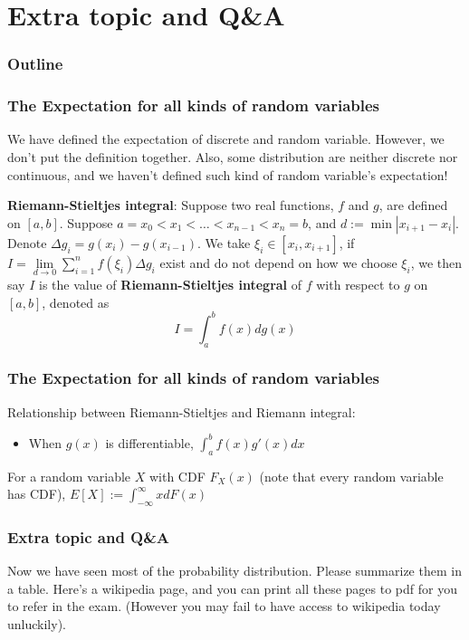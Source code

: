 \documentclass{beamer}
\begin{document}
\section{Extra topic and Q\&A}
\begin{frame}
    \frametitle{Outline}
    \tableofcontents[currentsection]
\end{frame}

\begin{frame}
    \frametitle{The Expectation for all kinds of random variables}
    We have defined the expectation of discrete and random variable. However, we don't put the definition together. Also, some distribution are neither discrete nor continuous, and we haven't defined such kind of random variable's expectation!\par
    \textbf{Riemann-Stieltjes integral}: Suppose two real functions, $f$ and $g$, are defined on $[a,b]$. Suppose $a=x_0<x_1<\dots <x_{n-1}<x_n=b$, and $d:=\min|x_{i+1}-x_{i}|$. Denote $\Delta g_i=g(x_i)-g(x_{i-1})$. We take $\xi_{i}\in [x_i,x_{i+1}]$, if $I=\lim\limits_{d\to 0}\sum\limits_{i=1}^{n}f(\xi_{i})\Delta g_i$ exist and do not depend on how we choose $\xi_{i}$, we then say $I$ is the value of \textbf{Riemann-Stieltjes integral} of $f$ with respect to $g$ on $[a,b]$, denoted as
    \[I=\int_{a}^{b}f(x)dg(x)\]
    

\end{frame}

\begin{frame}
    \frametitle{The Expectation for all kinds of random variables}
    Relationship between Riemann-Stieltjes and Riemann integral:
    \begin{itemize}
        \item When $g(x)$ is differentiable, $\int_{a}^{b}f(x)g'(x)dx$
    \end{itemize}\par
    \vspace{0.3cm}
    For a random variable $X$ with CDF $F_{X}(x)$ (note that every random variable has CDF), $E[X]:=\int_{-\infty}^{\infty}xdF(x)$

\end{frame}

\begin{frame}
    \frametitle{Extra topic and Q\&A}
    Now we have seen most of the probability distribution. Please summarize them in a table. Here's a wikipedia page, and you can print all these pages to pdf for you to refer in the exam. (However you may fail to have access to wikipedia today unluckily).\par
    \vspace{0.3cm}
    
    
\end{frame}
\end{document}
